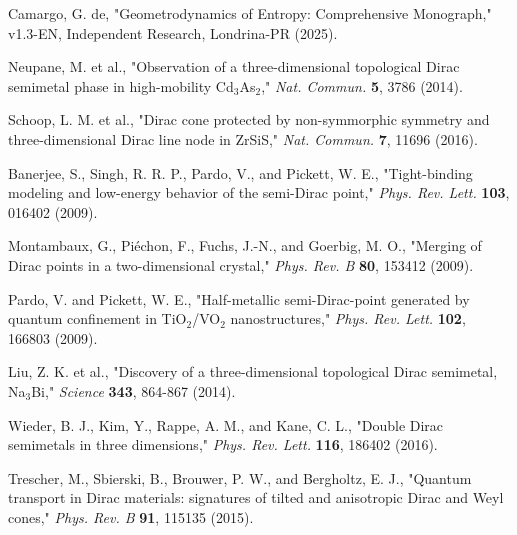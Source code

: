 \documentclass[12pt,a4paper]{article}
\begin{document}
\begin{thebibliography}{99}

Camargo, G. de, "Geometrodynamics of Entropy: Comprehensive Monograph," v1.3-EN, Independent Research, Londrina-PR (2025).

Neupane, M. et al., "Observation of a three-dimensional topological Dirac semimetal phase in high-mobility Cd$_3$As$_2$," \textit{Nat. Commun.} \textbf{5}, 3786 (2014).

Schoop, L. M. et al., "Dirac cone protected by non-symmorphic symmetry and three-dimensional Dirac line node in ZrSiS," \textit{Nat. Commun.} \textbf{7}, 11696 (2016).

Banerjee, S., Singh, R. R. P., Pardo, V., and Pickett, W. E., "Tight-binding modeling and low-energy behavior of the semi-Dirac point," \textit{Phys. Rev. Lett.} \textbf{103}, 016402 (2009).

Montambaux, G., Piéchon, F., Fuchs, J.-N., and Goerbig, M. O., "Merging of Dirac points in a two-dimensional crystal," \textit{Phys. Rev. B} \textbf{80}, 153412 (2009).

Pardo, V. and Pickett, W. E., "Half-metallic semi-Dirac-point generated by quantum confinement in TiO$_2$/VO$_2$ nanostructures," \textit{Phys. Rev. Lett.} \textbf{102}, 166803 (2009).

Liu, Z. K. et al., "Discovery of a three-dimensional topological Dirac semimetal, Na$_3$Bi," \textit{Science} \textbf{343}, 864-867 (2014).

Wieder, B. J., Kim, Y., Rappe, A. M., and Kane, C. L., "Double Dirac semimetals in three dimensions," \textit{Phys. Rev. Lett.} \textbf{116}, 186402 (2016).

Trescher, M., Sbierski, B., Brouwer, P. W., and Bergholtz, E. J., "Quantum transport in Dirac materials: signatures of tilted and anisotropic Dirac and Weyl cones," \textit{Phys. Rev. B} \textbf{91}, 115135 (2015).

\end{thebibliography}
\end{document}
